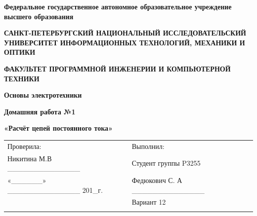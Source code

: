 \documentclass[12pt]{article}
\begin{document}
	\pagestyle{empty}
	\begin{center}
		\normalsize
		\textbf{Федеральное государственное автономное образовательное учреждение высшего образования}

		\small
		\medskip 
		\textbf{САНКТ-ПЕТЕРБУРГСКИЙ НАЦИОНАЛЬНЫЙ ИССЛЕДОВАТЕЛЬСКИЙ  УНИВЕРСИТЕТ ИНФОРМАЦИОННЫХ ТЕХНОЛОГИЙ, МЕХАНИКИ И ОПТИКИ}

		\medskip 
		\textbf{ФАКУЛЬТЕТ ПРОГРАММНОЙ ИНЖЕНЕРИИ И КОМПЬЮТЕРНОЙ ТЕХНИКИ}
	\end{center}
	\bigskip\bigskip\bigskip\bigskip\bigskip\bigskip\bigskip\bigskip\bigskip\bigskip\bigskip\bigskip
	\begin{center}
		\par\medskip\par\smallskip
		\Large
 
		\par\smallskip
		\textbf{Основы электротехники} 

		\textbf{Домашняя работа №1}

		\large
		\par\bigskip
		\textbf{«Расчёт цепей постоянного тока»}
		\par\bigskip\par\bigskip\par\bigskip\par\bigskip\par\bigskip\par\bigskip
		\par\bigskip\par\bigskip\par\bigskip\par\bigskip\par\bigskip\par\bigskip
		\par\bigskip\par\bigskip\par\bigskip\par\bigskip\par\bigskip\par\bigskip
	\end{center}
	\begin{center}
		\begin{tabular}{lllll}
			Проверила:	 										& \hspace{80pt}	&	Выполнил:									&\\
			Никитина М.В	 \_\_\_\_\_\_\_\_\_\_\_\_\_\_		&				&	Студент группы P3255						&\\
			«\_\_\_\_\_\_» 	\_\_\_\_\_\_\_\_\_\_\_\_\_\_ 201\_г.& 				&	Федюкович С. А \_\_\_\_\_\_\_\_\_\_\_\_\_\_	&\\
																&				&	Вариант 12									&\\
																&				&												&\\
		\end{tabular}
		\par\bigskip\par\bigskip\par\bigskip
                                                  
		\par\bigskip \par\bigskip
	\end{center}
\end{document}
